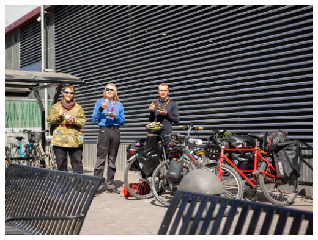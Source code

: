 \documentclass[10pt,finnish,a5paper,twoside=semi]{scrartcl}
\begin{document}
\begin{multicols}{2}
\begin{center}
		\noindent\includegraphics[width=0.94\linewidth]{assets/pyörävaellus9}
	\end{center}

	\columnbreak


\end{multicols}
\end{document}
